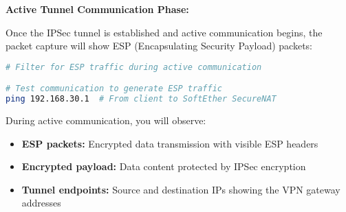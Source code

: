 \noindent
\textbf{Active Tunnel Communication Phase:}

\noindent
Once the IPSec tunnel is established and active communication begins, the packet capture will show ESP (Encapsulating Security Payload) packets:

\begin{lstlisting}[language=bash]
# Filter for ESP traffic during active communication

# Test communication to generate ESP traffic
ping 192.168.30.1  # From client to SoftEther SecureNAT
\end{lstlisting}

\noindent
During active communication, you will observe:
\begin{itemize}
    \item \textbf{ESP packets:} Encrypted data transmission with visible ESP headers
    \item \textbf{Encrypted payload:} Data content protected by IPSec encryption
    \item \textbf{Tunnel endpoints:} Source and destination IPs showing the VPN gateway addresses
\end{itemize}

